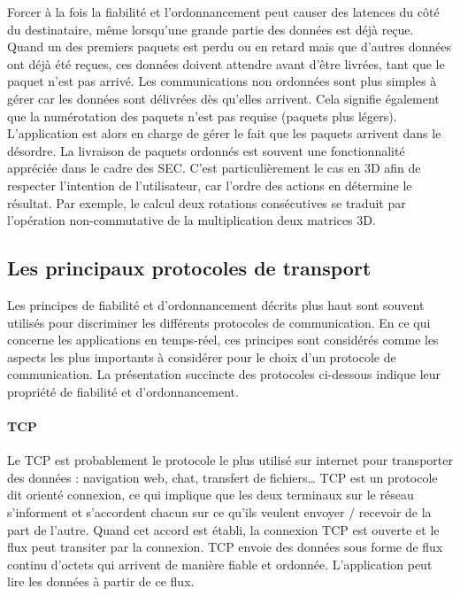 Forcer à la fois la fiabilité et l'ordonnancement peut causer des latences du côté 
du destinataire, même lorsqu'une grande partie des données est déjà reçue. Quand 
un des premiers paquets est perdu ou en retard mais que d'autres données ont 
déjà été reçues, ces données doivent attendre avant d'être livrées, tant que le 
paquet n'est pas arrivé. Les communications non ordonnées sont plus simples à 
gérer car les données sont délivrées dès qu'elles arrivent. Cela signifie également 
que la numérotation des paquets n'est pas requise (paquets plus légers). 
L'application est alors en charge de gérer le fait que les paquets arrivent dans le 
désordre. La livraison de paquets ordonnés est souvent une fonctionnalité 
appréciée dans le 
cadre des \gls{SEC}. C'est particulièrement le cas en \gls{3D} afin de respecter 
l'intention de l'utilisateur, car l'ordre des actions en détermine le résultat. Par 
exemple, le calcul deux rotations consécutives se traduit par l'opération non-commutative
de la multiplication deux matrices \gls{3D}.

\subsection{Les principaux protocoles de transport}
Les principes de fiabilité et d'ordonnancement décrits plus haut sont souvent 
utilisés pour discriminer les différents protocoles de communication. En ce qui concerne les 
applications en temps-réel, ces principes sont considérés comme les aspects les plus 
importants à considérer pour le choix d'un protocole de communication. La 
présentation succincte des protocoles ci-dessous indique leur propriété de 
fiabilité et d'ordonnancement.
\paragraph{TCP}
Le \gls{TCP} est probablement le protocole le plus utilisé sur internet pour 
transporter des données : navigation web, chat, transfert de fichiers\dots 
\gls{TCP} est un protocole dit \og orienté connexion\fg{}, ce qui implique que les 
deux terminaux sur le réseau s'informent et s'accordent chacun sur ce qu'ils 
veulent envoyer / recevoir de la part de l'autre. 
Quand cet accord est établi, la connexion \gls{TCP} est ouverte et le flux peut 
transiter par la connexion. 
\gls{TCP} envoie des données sous forme de flux continu d'octets qui arrivent de 
manière fiable et ordonnée. 
L'application peut lire les données à partir de ce flux.

